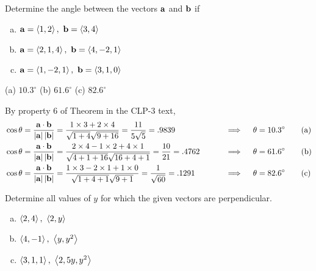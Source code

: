 \begin{question}
Determine the angle between the vectors $\mathbf{a}$ and $\mathbf{b}$ if
\begin{enumerate}[(a)]
\item
   $\mathbf{a}=\left< 1,2\right>,\ \mathbf{b}=\left< 3,4\right>$ 
\item
   $\mathbf{a}=\left< 2,1,4\right>,\ \mathbf{b}=\left< 4,-2,1\right>$ 
\item
  $\mathbf{a}=\left< 1,-2,1\right>,\ \mathbf{b}=\left< 3,1,0\right>$ 
\end{enumerate}
\end{question}

%

\begin{answer}
(a) $10.3^\circ$\qquad
(b) $61.6^\circ$\qquad
(c) $82.6^\circ$
\end{answer}

\begin{solution}
\leqnomode
By property 6 of Theorem  in the CLP-3 text,
\begin{alignat*}{3}
&\cos\theta=\frac{\mathbf{a}\cdot\mathbf{b}}{|\mathbf{a}|\,|\mathbf{b}|}
        =\frac{1\times 3+2\times 4}{\sqrt{1+4}\sqrt{9+16}}
        =\frac{11}{5\sqrt{5}}= .9839 
\qquad &&\implies\quad \theta=10.3^\circ
\tag{a} \\
&\cos\theta=\frac{\mathbf{a}\cdot\mathbf{b}}{|\mathbf{a}|\,|\mathbf{b}|}
        =\frac{2\times 4-1\times 2+4\times 1}{\sqrt{4+1+16}\sqrt{16+4+1}}
        =\frac{10}{21}= .4762 
\qquad &&\implies\quad \theta=61.6^\circ
\tag{b} \\
 &\cos\theta=\frac{\mathbf{a}\cdot\mathbf{b}}{|\mathbf{a}|\,|\mathbf{b}|}
        =\frac{1\times 3-2\times 1+1\times 0}{\sqrt{1+4+1}\sqrt{9+1}}
        =\frac{1}{\sqrt{60}}= .1291 
\qquad &&\implies\quad \theta=82.6^\circ
\tag{c}
\end{alignat*}
\reqnomode
\end{solution}

\begin{question}
Determine all values of $y$ for which the given vectors are perpendicular.
\begin{enumerate}[(a)]
\item
$\left< 2,4\right> ,\ \left< 2,y\right> $ 
\item
$\left< 4,-1\right> ,\ \left< y,y^2\right> $ 
\item
$\left< 3,1,1\right> ,\ \left< 2,5y,y^2\right> $ 
\end{enumerate}
\end{question}

